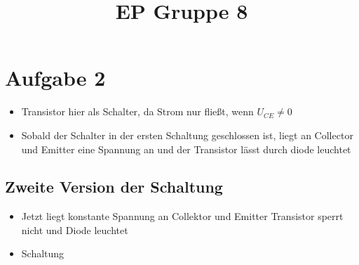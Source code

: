 \documentclass[compress,11pt]{beamer}
\title{EP Gruppe 8}
\begin{document}
\section{Aufgabe 2}
\begin{frame}
\begin{itemize}
\subsection{Erste Version der Schaltung}
\item Transistor hier als Schalter, da Strom nur fließt, wenn $U_{CE} \neq 0$
\item Sobald der Schalter in der ersten Schaltung geschlossen ist, liegt an Collector und Emitter eine Spannung an und der Transistor lässt durch \Rightarrow diode leuchtet
\end{itemize}
\subsection{Zweite Version der Schaltung}
\begin{itemize}
\item Jetzt liegt konstante Spannung an Collektor und Emitter \Rightarrow Transistor sperrt nicht und Diode leuchtet
\item Schaltung
\end{itemize}
\end{frame}
\end{document}
